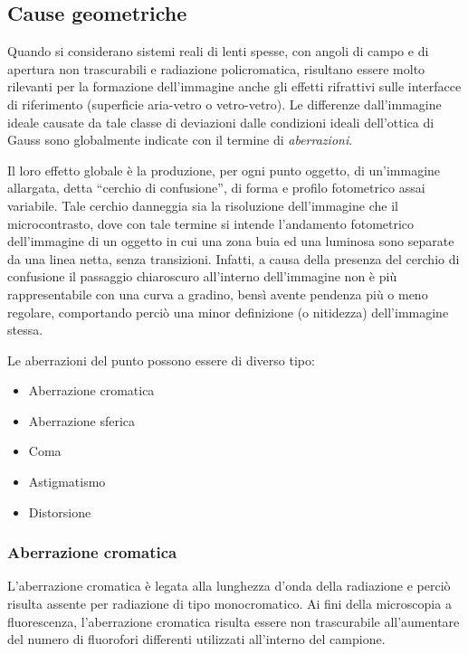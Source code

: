 \subsection{Cause geometriche}

Quando si considerano sistemi reali di lenti spesse, con angoli di campo e di apertura non trascurabili e radiazione policromatica, risultano essere molto rilevanti per la formazione dell'immagine anche gli effetti rifrattivi sulle interfacce di riferimento (superficie aria-vetro o vetro-vetro).
Le differenze dall'immagine ideale causate da tale classe di deviazioni dalle condizioni ideali dell'ottica di Gauss sono globalmente indicate con il termine di \textit{aberrazioni}.

Il loro effetto globale è la produzione, per ogni punto oggetto, di un'immagine allargata, detta ``cerchio di confusione'', di forma e profilo fotometrico assai variabile. 
Tale cerchio danneggia sia la risoluzione dell'immagine che il microcontrasto, dove con tale termine si intende l'andamento fotometrico dell'immagine di un oggetto in cui una zona buia ed una luminosa sono separate da una linea netta, senza transizioni. 
Infatti, a causa della presenza del cerchio di confusione il passaggio chiaroscuro all'interno dell'immagine non è più rappresentabile con una curva a gradino, bensì avente pendenza più o meno regolare, comportando perciò una minor definizione (o nitidezza) dell'immagine stessa.

Le aberrazioni del punto possono essere di diverso tipo:
\begin{itemize}
 \item Aberrazione cromatica
 \item Aberrazione sferica
 \item Coma
 \item Astigmatismo
 \item Distorsione
\end{itemize}


\subsubsection*{Aberrazione cromatica}
L'aberrazione cromatica è legata alla lunghezza d'onda della radiazione e perciò risulta assente per radiazione di tipo monocromatico. 
Ai fini della microscopia a fluorescenza, l'aberrazione cromatica risulta essere non trascurabile all'aumentare del numero di fluorofori differenti utilizzati all'interno del campione.

